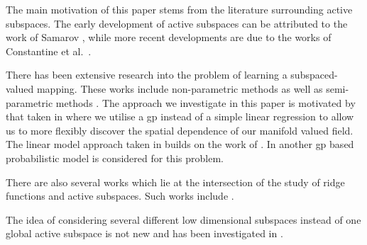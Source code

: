 
The main motivation of this paper stems from the literature surrounding active subspaces. The early development of active subspaces can be attributed to the work of Samarov \cite{samarovExploringRegressionStructure1993}, while more recent developments are due to the works of Constantine et al.\ \cite{constantineActiveSubspacesEmerging2015a,constantineComputingActiveSubspaces2015,constantineActiveSubspaceMethods2014}.

There has been extensive research into the problem of learning a subspaced-valued mapping. These works include non-parametric methods \cite[see also references therein]{yuanLocalPolynomialRegression2012} as well as semi-parametric methods \cite{shiIntrinsicRegressionModels2012}. The approach we investigate in this paper is motivated by that taken in \cite{pigoliKrigingPredictionManifoldvalued2016} where we utilise a \ac{gp} instead of a simple linear regression to allow us to more flexibly discover the spatial dependence of our manifold valued field. The linear model approach taken in \cite{pigoliKrigingPredictionManifoldvalued2016} builds on the work of \cite{thomasfletcherGeodesicRegressionTheory2013}. In \cite{zhangGaussianProcessSubspace2021} another \ac{gp} based probabilistic model is considered for this problem.

There are also several works which lie at the intersection of the study of ridge functions and active subspaces. Such works include \cite{seshadriDimensionReductionGaussian2019,wongEmbeddedRidgeApproximations2020,scillitoePolynomialRidgeFlowfield2021}.

The idea of considering several different low dimensional subspaces instead of one global active subspace is not new and has been investigated in \cite{xiongClusteredActivesubspaceBased2021}.
